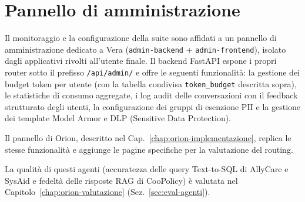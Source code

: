 \section{Pannello di amministrazione}
\label{sec:agenti-admin-impl}

Il monitoraggio e la configurazione della suite sono affidati a un pannello
di amministrazione dedicato a Vera (\texttt{admin-backend} +
\texttt{admin-frontend}),  isolato dagli applicativi
rivolti all'utente finale. Il backend FastAPI espone i propri router sotto
il prefisso \texttt{/api/admin/} e offre le seguenti funzionalità:
la gestione dei budget token per utente (con la tabella condivisa
\texttt{token\_budget} descritta sopra), le statistiche di consumo aggregate,
i log audit delle conversazioni con il feedback strutturato degli utenti,
la configurazione dei gruppi di esenzione PII e la gestione dei template
Model Armor e DLP (Sensitive Data Protection).

Il pannello di Orion, descritto nel
Cap.~\ref{chap:orion-implementazione}, replica le stesse funzionalità
e aggiunge le pagine specifiche per la valutazione del routing.

La qualità di questi agenti (accuratezza delle query Text-to-SQL di
AllyCare e SysAid e fedeltà delle risposte RAG di CooPolicy) è valutata
nel Capitolo~\ref{chap:orion-valutazione}
(Sez.~\ref{sec:eval-agenti}).
